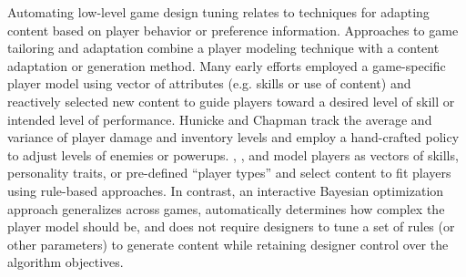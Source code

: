\documentclass[letterpaper]{article}
\begin{document}
Automating low-level game design tuning relates to techniques for adapting content based on player behavior or preference information.
Approaches to game tailoring and adaptation combine a player modeling technique with a content adaptation or generation method. Many early efforts employed a game-specific player model using vector of attributes (e.g. skills or use of content) and reactively selected new content to guide players toward a desired level of skill or intended level of performance. Hunicke and Chapman  track the average and variance of player damage and inventory levels and employ a hand-crafted policy to adjust levels of enemies or powerups. \cite{magerko2006:isat}, \cite{el-nasr2007}, and \cite{thue2007:storytell-pm} model players as vectors of skills, personality traits, or pre-defined ``player types'' and select content to fit players using rule-based approaches. In contrast, an interactive Bayesian optimization approach generalizes across games, automatically determines how complex the player model should be, and does not require designers to tune a set of rules (or other parameters) to generate content while retaining designer control over the algorithm objectives. 


\end{document}
